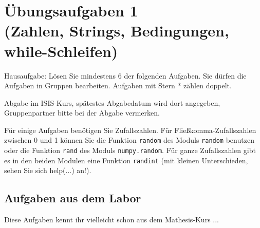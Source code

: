 

\section*{Übungsaufgaben 1 \\
(Zahlen, Strings, Bedingungen, while-Schleifen)}

Hausaufgabe: Lösen Sie mindestens 6 der folgenden Aufgaben. Sie dürfen die
Aufgaben in Gruppen bearbeiten. Aufgaben mit Stern * zählen doppelt.

Abgabe im ISIS-Kurs, spätestes Abgabedatum wird dort angegeben, Gruppenpartner bitte bei der Abgabe vermerken.

Für einige Aufgaben benötigen Sie Zufallszahlen. Für Fließkomma-Zufallszahlen
zwischen 0 und 1 können Sie die Funktion \texttt{random} des Moduls \texttt{random} benutzen oder die Funktion \texttt{rand} des Moduls \texttt{numpy.random}.
Für ganze Zufallszahlen gibt es in den beiden Modulen eine Funktion \texttt{randint} (mit kleinen Unterschieden, sehen Sie sich help(...) an!).


\subsection*{Aufgaben aus dem Labor}

Diese Aufgaben kennt ihr vielleicht schon aus dem Mathesis-Kurs ... 

